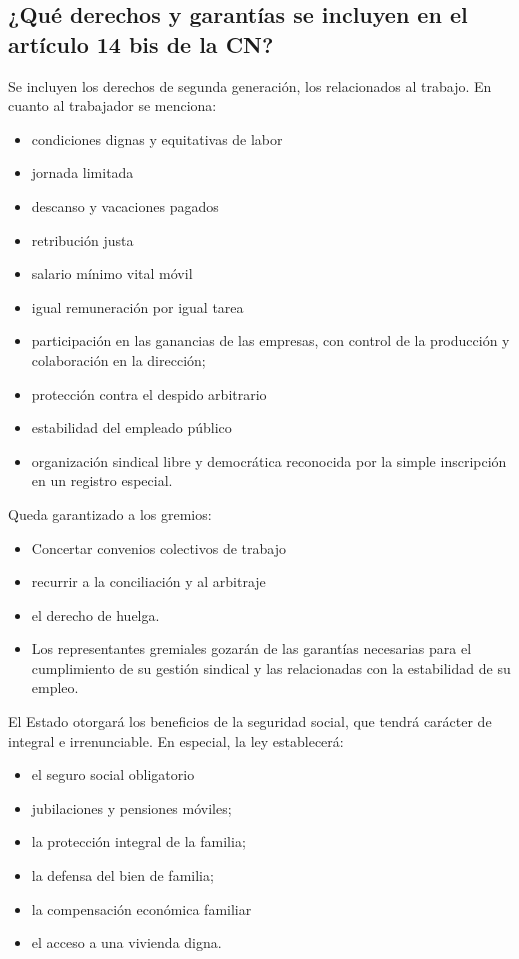 \documentclass{article}
\begin{document}
\subsection{¿Qué derechos y garantías se incluyen en el artículo 14 bis de la CN?} \label{ssec:arti14bis}
Se incluyen los derechos de segunda generación, los relacionados al trabajo. 
En cuanto al trabajador se menciona:
\begin{itemize}
\item condiciones dignas y equitativas de labor
\item jornada limitada
\item descanso y vacaciones pagados
\item retribución justa
\item salario mínimo vital móvil
\item igual remuneración por igual tarea
\item participación en las ganancias de las empresas, con control de la producción y colaboración en la dirección;
\item protección contra el despido arbitrario
\item estabilidad del empleado público
\item organización sindical libre y democrática reconocida por la simple inscripción en un registro especial.
\end{itemize}
Queda garantizado a los gremios:
\begin{itemize}
\item Concertar convenios colectivos de trabajo
\item recurrir a la conciliación y al arbitraje
\item el derecho de huelga. 
\item Los representantes gremiales gozarán de las garantías necesarias para el cumplimiento de su gestión sindical y las relacionadas con la estabilidad de su empleo.
\end{itemize}

El Estado otorgará los beneficios de la seguridad social, que tendrá carácter de integral e irrenunciable. En especial, la ley establecerá: 

\begin{itemize}
\item el seguro social obligatorio 
\item jubilaciones y pensiones móviles;
\item la protección integral de la familia; 
\item la defensa del bien de familia; 
\item la compensación económica familiar
\item el acceso a una vivienda digna.
\end{itemize}
\end{document}
